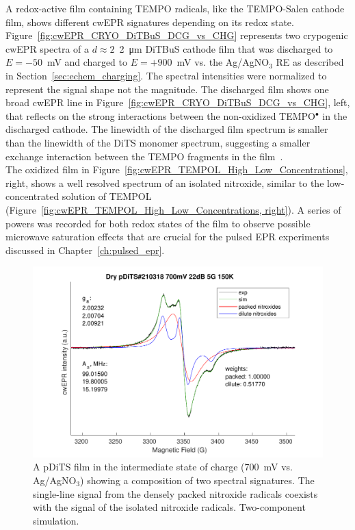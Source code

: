 A redox-active film containing TEMPO radicals, like the TEMPO-Salen cathode film, shows different cwEPR signatures depending on its redox state. Figure~\ref{fig:cwEPR_CRYO_DiTBuS_DCG_vs_CHG} represents two crypogenic cwEPR spectra of a $d\approx2$~\SI{2}{\micro\meter} DiTBuS cathode film that was discharged to $E=-50$~mV and charged to $E=+900$~mV vs. the Ag/AgNO$_3$ RE as described in Section~\ref{sec:echem_charging}. The spectral intensities were normalized to represent the signal shape not the magnitude. The discharged film shows one broad cwEPR line in Figure~\ref{fig:cwEPR_CRYO_DiTBuS_DCG_vs_CHG}, left, that reflects on the strong interactions between the non-oxidized TEMPO$^{\bullet}$ in the discharged cathode. The linewidth of the discharged film spectrum is smaller than the linewidth of the DiTS monomer spectrum, suggesting a smaller exchange interaction between the TEMPO fragments in the film~\cite{Vereshchagin2020}.\\
The oxidized film in Figure~\ref{fig:cwEPR_TEMPOL_High_Low_Concentrations}, right, shows a well resolved spectrum of an isolated nitroxide, similar to the low-concentrated solution of TEMPOL (Figure~\ref{fig:cwEPR_TEMPOL_High_Low_Concentrations, right}). A series of powers was recorded for both redox states of the film to observe possible microwave saturation effects that are crucial for the pulsed EPR experiments discussed in Chapter~\ref{ch:pulsed_epr}.



\begin{figure}[]
\center
	\includegraphics[width=1\textwidth]{./operando_epr/figures/CRYO/cw_sim_pDiTS_210318_700mV_2comp.pdf}
	\caption{A pDiTS film in the intermediate state of charge (700~mV vs. Ag/AgNO$_3$) showing a composition of two spectral signatures. The single-line signal from the densely packed nitroxide radicals coexists with the signal of the isolated nitroxide radicals. Two-component simulation.}
	\label{fig:cwEPR_CRYO_DiTS_2_COMP_SIM}
\end{figure}


